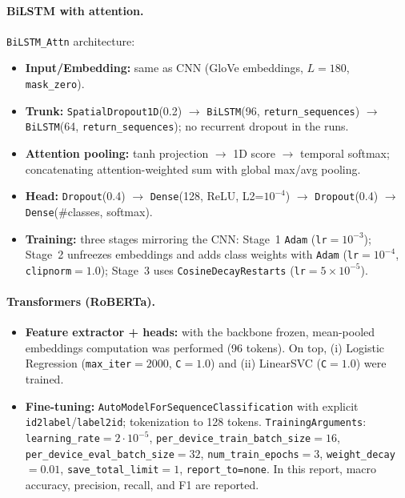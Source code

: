 \documentclass[10pt]{article}
\begin{document}
\paragraph{BiLSTM with attention.}
\texttt{BiLSTM\_Attn} architecture:
\begin{itemize}
  \item \textbf{Input/Embedding:} same as CNN (GloVe embeddings, $L=180$, \texttt{mask\_zero}).
  \item \textbf{Trunk:} \texttt{SpatialDropout1D}(0.2) $\rightarrow$ \texttt{BiLSTM}(96, \texttt{return\_sequences}) $\rightarrow$ \texttt{BiLSTM}(64, \texttt{return\_sequences}); no recurrent dropout in the runs.
  \item \textbf{Attention pooling:} tanh projection $\rightarrow$ 1D score $\rightarrow$ temporal softmax; concatenating attention-weighted sum with global max/avg pooling.
  \item \textbf{Head:} \texttt{Dropout}(0.4) $\rightarrow$ \texttt{Dense}(128, ReLU, L2=$10^{-4}$) $\rightarrow$ \texttt{Dropout}(0.4) $\rightarrow$ \texttt{Dense}(\#classes, softmax).
  \item \textbf{Training:} three stages mirroring the CNN: Stage~1 \texttt{Adam} (\texttt{lr}$=10^{-3}$); Stage~2 unfreezes embeddings and adds class weights with \texttt{Adam} (\texttt{lr}$=10^{-4}$, \texttt{clipnorm}$=1.0$); Stage~3 uses \texttt{CosineDecayRestarts} (\texttt{lr}$=5\!\times\!10^{-5}$).
\end{itemize}

\paragraph{Transformers (RoBERTa).}
\begin{itemize}
  \item \textbf{Feature extractor + heads:} with the backbone frozen, mean-pooled embeddings computation was performed (96 tokens). On top, (i) Logistic Regression (\texttt{max\_iter}$=2000$, \texttt{C}$=1.0$) and (ii) LinearSVC (\texttt{C}$=1.0$) were trained.
  \item \textbf{Fine-tuning:} \texttt{AutoModelForSequenceClassification} with explicit \texttt{id2label}/\texttt{label2id}; tokenization to 128 tokens.
        \texttt{TrainingArguments}: \texttt{learning\_rate}$=2\cdot10^{-5}$, \texttt{per\_device\_train\_batch\_size}$=16$, \texttt{per\_device\_eval\_batch\_size}$=32$, \texttt{num\_train\_epochs}$=3$, \texttt{weight\_decay}$=0.01$, \texttt{save\_total\_limit}$=1$, \texttt{report\_to=none}. In this report, macro accuracy, precision, recall, and F1 are reported.
\end{itemize}
\end{document}
